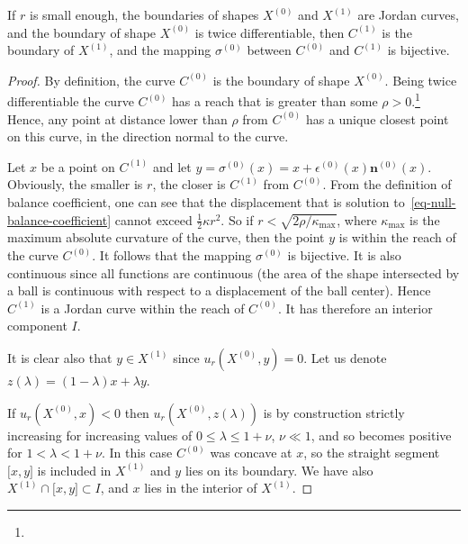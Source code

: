\documentclass[review]{siamart220329}
\begin{document}
\begin{proposition} \label{prop-C-equ-X}
  If $r$ is small enough, the boundaries of shapes $X^{(0)}$ and
  $X^{(1)}$ are Jordan curves, and the boundary of shape $X^{(0)}$ is
  twice differentiable, then $C^{(1)}$ is the boundary of $X^{(1)}$,
  and the mapping $\sigma^{(0)}$ between $C^{(0)}$ and $C^{(1)}$ is
  bijective.
\end{proposition}
\begin{proof}
  By definition, the curve $C^{(0)}$ is the boundary of shape
  $X^{(0)}$.  Being twice differentiable the curve $C^{(0)}$ has a
  reach that is greater than some $\rho > 0$.\footnote{} Hence, any point at distance lower than $\rho$
  from $C^{(0)}$ has a unique closest point on this curve, in the
  direction normal to the curve.

  Let $x$ be a point on $C^{(1)}$ and let
  $y=\sigma^{(0)}(x)=x+\epsilon^{(0)}(x) \mathbf{n}^{(0)}(x)$.
  Obviously, the smaller is $r$, the closer is $C^{(1)}$ from
  $C^{(0)}$.  From the definition of balance coefficient, one can see
  that the displacement that is solution to~\cref{eq-null-balance-coefficient} cannot exceed $\frac{1}{2}\kappa
  r^2$. So if $r < \sqrt{2\rho / \kappa_{\max}}$, where
  $\kappa_{\max}$ is the maximum absolute curvature of the curve, then
  the point $y$ is within the reach of the curve $C^{(0)}$. It follows
  that the mapping $\sigma^{(0)}$ is bijective. It is also continuous
  since all functions are continuous (the area of the shape
  intersected by a ball is continuous with respect to a displacement
  of the ball center).  Hence $C^{(1)}$ is a Jordan curve within the
  reach of $C^{(0)}$. It has therefore an interior component $I$.

  It is clear also that $y \in X^{(1)}$ since $u_r(X^{(0)},y)=0$.
  Let us denote $z(\lambda)=(1-\lambda)x+\lambda y$.

  If $u_r(X^{(0)},x)<0$ then $u_r(X^{(0)},z(\lambda))$ is by
  construction strictly increasing for increasing values of $0 \le
  \lambda \le 1+\nu$, $\nu \ll 1$, and so becomes positive for
  $1<\lambda < 1 + \nu$. In this case $C^{(0)}$ was concave at $x$,
  so the straight segment $\lbrack x,y \rbrack$ is included in
  $X^{(1)}$ and $y$ lies on its boundary. We have also $X^{(1)}
  \cap \lbrack x,y \rbrack \subset I$, and $x$ lies in the interior of
  $X^{(1)}$.
  

\end{proof}
\end{document}
